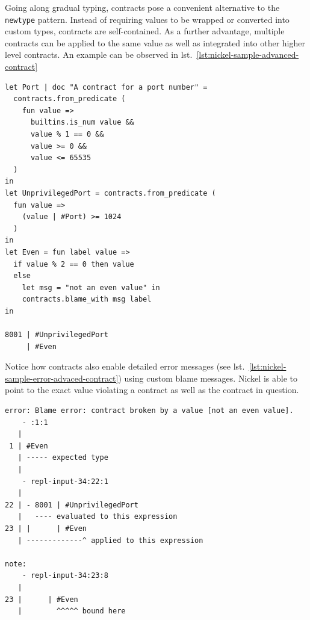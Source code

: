 \documentclass[
  a4paper,
  bibtex,
  english,
  nomenclature]{kthlatex/kththesis/kththesis}
\begin{document}
Going along gradual typing, contracts pose a convenient alternative to
the \texttt{newtype} pattern. Instead of requiring values to be wrapped
or converted into custom types, contracts are self-contained. As a
further advantage, multiple contracts can be applied to the same value
as well as integrated into other higher level contracts. An example can
be observed in lst.~\ref{lst:nickel-sample-advanced-contract}

\begin{codelisting}

\caption{More advaced use of contracts restricting values to an even smaller domain}

\hypertarget{lst:nickel-sample-advanced-contract}{%
\label{lst:nickel-sample-advanced-contract}}%
\begin{verbatim}
let Port | doc "A contract for a port number" =
  contracts.from_predicate (
    fun value =>
      builtins.is_num value &&
      value % 1 == 0 &&
      value >= 0 &&
      value <= 65535
  )
in
let UnprivilegedPort = contracts.from_predicate (
  fun value =>
    (value | #Port) >= 1024  
  )
in
let Even = fun label value =>
  if value % 2 == 0 then value
  else
    let msg = "not an even value" in
    contracts.blame_with msg label
in

8001 | #UnprivilegedPort
     | #Even
\end{verbatim}

\end{codelisting}

Notice how contracts also enable detailed error messages (see
lst.~\ref{lst:nickel-sample-error-advaced-contract}) using custom blame
messages. Nickel is able to point to the exact value violating a
contract as well as the contract in question.

\begin{codelisting}

\caption{Example error message for failed contract}

\hypertarget{lst:nickel-sample-error-advaced-contract}{%
\label{lst:nickel-sample-error-advaced-contract}}%
\begin{verbatim}
error: Blame error: contract broken by a value [not an even value].
    - :1:1
   |
 1 | #Even
   | ----- expected type
   |
    - repl-input-34:22:1
   |  
22 | - 8001 | #UnprivilegedPort
   |   ---- evaluated to this expression
23 | |      | #Even
   | -------------^ applied to this expression

note: 
    - repl-input-34:23:8
   |
23 |      | #Even
   |        ^^^^^ bound here
\end{verbatim}

\end{codelisting}
\end{document}
